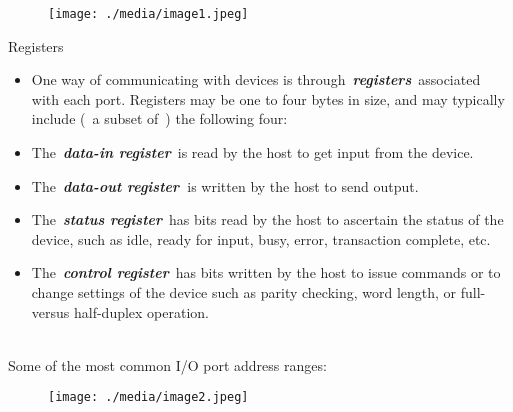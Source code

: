 \documentclass[12pt]{article}
\begin{document}
\begin{figure}[H]
	\begin{Center}
		\texttt{[image: ./media/image1.jpeg]}
	\end{Center}
\end{figure}



\par

Registers\par

\begin{itemize}
	\item One way of communicating with devices is through \textbf{\textit{registers}} associated with each port. Registers may be one to four bytes in size, and may typically include ( a subset of ) the following four:
\end{itemize}\par

\begin{itemize}
	\item The \textbf{\textit{data-in register}} is read by the host to get input from the device.\par

	\item The \textbf{\textit{data-out register }}is written by the host to send output.\par

	\item The \textbf{\textit{status register}} has bits read by the host to ascertain the status of the device, such as idle, ready for input, busy, error, transaction complete, etc.\par

	\item The \textbf{\textit{control register}} has bits written by the host to issue commands or to change settings of the device such as parity checking, word length, or full- versus half-duplex operation.
\end{itemize}\par

 \\
Some of the most common I/O port address ranges:\par




\begin{figure}[H]
	\begin{Center}
		\texttt{[image: ./media/image2.jpeg]}
	\end{Center}
\end{figure}
\end{document}
